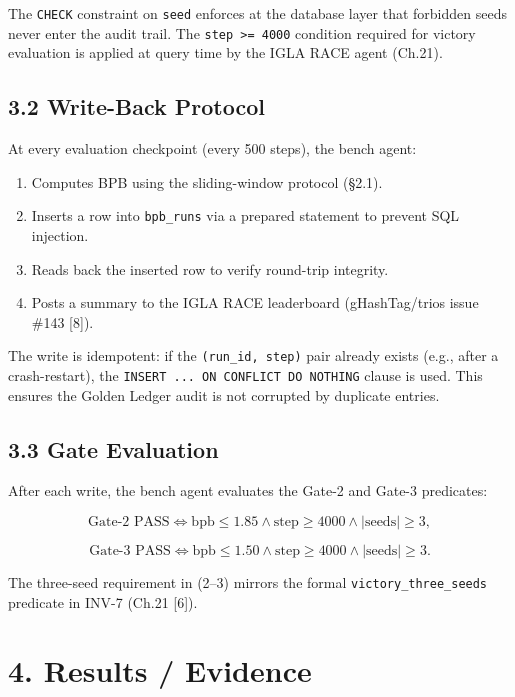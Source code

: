 The \texttt{CHECK} constraint on \texttt{seed}
enforces at the database layer that forbidden
seeds never enter the audit trail. The
\texttt{step\ \textgreater{}=\ 4000} condition
required for victory evaluation is applied at
query time by the IGLA RACE agent (Ch.21).

\subsection{3.2 Write-Back
Protocol}\label{fa_15:write-back-protocol}

At every evaluation checkpoint (every 500 steps),
the bench agent:

\begin{enumerate}
\def\labelenumi{\arabic{enumi}.}
\tightlist
\item
  Computes BPB using the sliding-window protocol
  (§2.1).
\item
  Inserts a row into \texttt{bpb\_runs} via a
  prepared statement to prevent SQL injection.
\item
  Reads back the inserted row to verify round-trip
  integrity.
\item
  Posts a summary to the IGLA RACE leaderboard
  (gHashTag/trios issue \#143 [8]).
\end{enumerate}

The write is idempotent: if the
\texttt{(run\_id,\ step)} pair already exists
(e.g., after a crash-restart), the
\texttt{INSERT\ ...\ ON\ CONFLICT\ DO\ NOTHING}
clause is used. This ensures the Golden Ledger
audit is not corrupted by duplicate entries.

\subsection{3.3 Gate
Evaluation}\label{fa_15:gate-evaluation}

After each write, the bench agent evaluates the
Gate-2 and Gate-3 predicates:

\[\text{Gate-2 PASS} \iff \text{bpb} \leq 1.85 \land \text{step} \geq 4000 \land |\text{seeds}| \geq 3, \tag{2}\]

\[\text{Gate-3 PASS} \iff \text{bpb} \leq 1.50 \land \text{step} \geq 4000 \land |\text{seeds}| \geq 3. \tag{3}\]

The three-seed requirement in (2--3) mirrors the
formal \texttt{victory\_three\_seeds} predicate in
INV-7 (Ch.21 [6]).

\section{4. Results /
Evidence}\label{fa_15:results-evidence}

